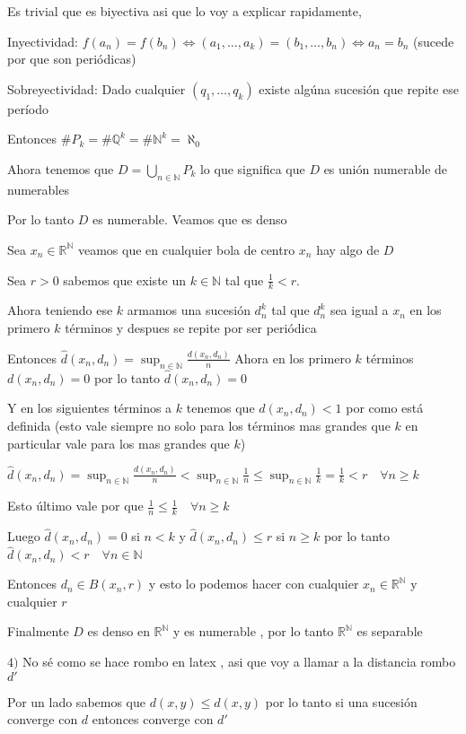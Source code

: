 \documentclass[12pt]{article}
\newcommand{\n}{\aleph_{0}}
\newcommand{\Q}{\mathbb{Q}}
\newcommand{\R}{\mathbb{R}}
\newcommand{\N}{\mathbb{N}}
\theoremstyle{definition}
\begin{document}
Es trivial que es biyectiva asi que lo voy a explicar rapidamente, 

Inyectividad: $f(a_n) = f(b_n) \iff (a_1,\dots,a_k) = (b_1,\dots,b_n) \iff a_n = b_n $ (sucede por que son periódicas)

Sobreyectividad: Dado cualquier $(q_1,\dots,q_k)$ existe algúna sucesión que repite ese período 

Entonces $\# P_k = \# \Q^k = \# \N^k = \n$

Ahora tenemos que $D = \bigcup_{n \in \N} P_k$ lo que significa que $D$ es unión numerable de numerables 

Por lo tanto $D$ es numerable. Veamos que es denso

Sea $x_n \in \R^{\N}$ veamos que en cualquier bola de centro $x_n$ hay algo de $D$

Sea $r>0$ sabemos que existe un $k \in \N$ tal que $\frac{1}{k} < r$.

Ahora teniendo ese $k$ armamos una sucesión $d_n^k$ tal que $d_n^k$ sea igual a $x_n$ en los primero $k$ términos y despues se repite por ser periódica

Entonces $\hat{d}(x_n,d_n) = \sup_{n \in \N}\frac{d(x_n,d_n)}{n}$ Ahora en los primero $k$ términos $d(x_n,d_n) = 0$ por lo tanto $\hat{d} (x_n,d_n) = 0$

Y en los siguientes términos a $k$ tenemos que $d(x_n,d_n) < 1$ por como está definida (esto vale siempre no solo para los términos mas grandes que $k$ en particular vale para los mas grandes que $k$)

$\hat{d}(x_n,d_n) = \sup_{n \in \N} \frac{d(x_n,d_n)}{n} < \sup_{n \in \N} \frac{1}{n} \leq \sup_{n \in \N} \frac{1}{k} = \frac{1}{k} < r \quad \forall n \geq k$

Esto último vale por que $\frac{1}{n} \leq \frac{1}{k} \quad \forall n \geq k$

Luego $\hat{d}(x_n,d_n) = 0$ si $n < k$ y $\hat{d}(x_n,d_n) \leq r$ si $n \geq k$ por lo tanto $\hat{d}(x_n,d_n) < r \quad \forall n \in \N$

Entonces $d_n \in B(x_n,r)$ y esto lo podemos hacer con cualquier $x_n \in \R^{\N}$ y cualquier $r$

Finalmente $D$ es denso en $\R^{\N}$ y es numerable , por lo tanto $\R^{\N}$ es separable

$4) $ No sé como se hace rombo en latex , asi que voy a llamar a la distancia rombo $d'$

Por un lado sabemos que $d(x,y) \leq d(x,y)$ por lo tanto si una sucesión converge con $d$ entonces converge con $d'$
\end{document}
